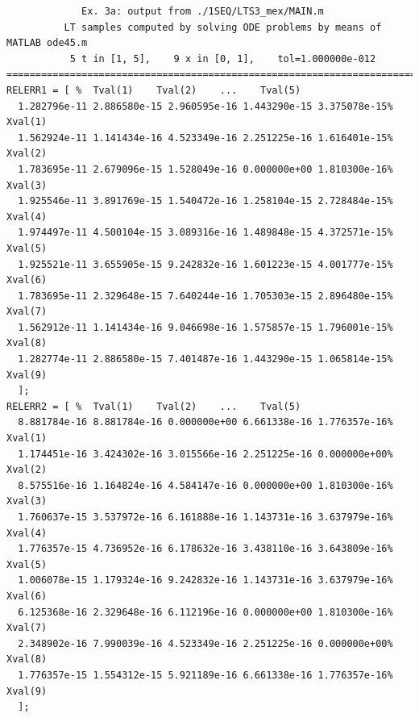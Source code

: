 \documentclass[a4paper,10pt]{report}%
\begin{document}
\begin{lstlisting}
             Ex. 3a: output from ./1SEQ/LTS3_mex/MAIN.m
          LT samples computed by solving ODE problems by means of MATLAB ode45.m
           5 t in [1, 5],    9 x in [0, 1],    tol=1.000000e-012
====================================================================================
RELERR1 = [ %  Tval(1)    Tval(2)    ...    Tval(5)
  1.282796e-11 2.886580e-15 2.960595e-16 1.443290e-15 3.375078e-15% Xval(1)
  1.562924e-11 1.141434e-16 4.523349e-16 2.251225e-16 1.616401e-15% Xval(2)
  1.783695e-11 2.679096e-15 1.528049e-16 0.000000e+00 1.810300e-16% Xval(3)
  1.925546e-11 3.891769e-15 1.540472e-16 1.258104e-15 2.728484e-15% Xval(4)
  1.974497e-11 4.500104e-15 3.089316e-16 1.489848e-15 4.372571e-15% Xval(5)
  1.925521e-11 3.655905e-15 9.242832e-16 1.601223e-15 4.001777e-15% Xval(6)
  1.783695e-11 2.329648e-15 7.640244e-16 1.705303e-15 2.896480e-15% Xval(7)
  1.562912e-11 1.141434e-16 9.046698e-16 1.575857e-15 1.796001e-15% Xval(8)
  1.282774e-11 2.886580e-15 7.401487e-16 1.443290e-15 1.065814e-15% Xval(9)
  ];
RELERR2 = [ %  Tval(1)    Tval(2)    ...    Tval(5)
  8.881784e-16 8.881784e-16 0.000000e+00 6.661338e-16 1.776357e-16% Xval(1)
  1.174451e-16 3.424302e-16 3.015566e-16 2.251225e-16 0.000000e+00% Xval(2)
  8.575516e-16 1.164824e-16 4.584147e-16 0.000000e+00 1.810300e-16% Xval(3)
  1.760637e-15 3.537972e-16 6.161888e-16 1.143731e-16 3.637979e-16% Xval(4)
  1.776357e-15 4.736952e-16 6.178632e-16 3.438110e-16 3.643809e-16% Xval(5)
  1.006078e-15 1.179324e-16 9.242832e-16 1.143731e-16 3.637979e-16% Xval(6)
  6.125368e-16 2.329648e-16 6.112196e-16 0.000000e+00 1.810300e-16% Xval(7)
  2.348902e-16 7.990039e-16 4.523349e-16 2.251225e-16 0.000000e+00% Xval(8)
  1.776357e-15 1.554312e-15 5.921189e-16 6.661338e-16 1.776357e-16% Xval(9)
  ];
\end{lstlisting}
\end{document}
